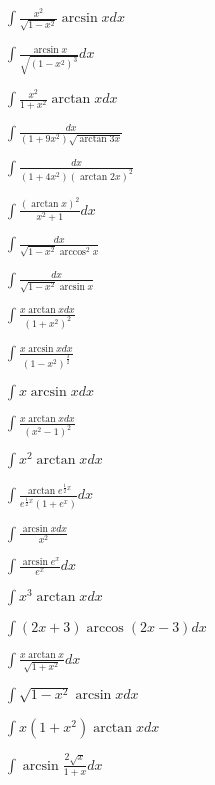 
\begin{multicols}{2}
$\displaystyle \int \frac{x^2}{\sqrt{1-x^2}}\arcsin x dx$

$\displaystyle \int \frac{\arcsin x}{\sqrt{(1-x^2)^3}} dx$

$\displaystyle \int \frac{x^2}{1+x^2}\arctan x dx$

$\displaystyle \int \frac{dx}{(1+9x^2)\sqrt{\arctan 3x}}$

$\displaystyle \int \frac{dx}{(1+4x^2)(\arctan 2x)^2}$

$\displaystyle \int \frac{(\arctan x)^2}{x^2+1}dx$

$\displaystyle \int \frac{dx}{\sqrt{1-x^2}\arccos^2 x}$

$\displaystyle \int \frac{dx}{\sqrt{1-x^2}\arcsin x}$

$\displaystyle \int \frac{x\arctan x dx}{(1+x^2)^2}$

$\displaystyle \int \frac{x\arcsin x dx}{(1-x^2)^{\frac{3}{2}}}$

$\displaystyle \int x\arcsin x dx$

$\displaystyle \int \frac{x\arctan x dx}{(x^2-1)^2}$

$\displaystyle \int x^2\arctan x dx$

$\displaystyle \int \frac{\arctan e^{\frac{1}{2}x}}{e^{\frac{1}{2}x}(1+e^x)}dx$

$\displaystyle \int \frac{\arcsin x dx}{x^2}$

$\displaystyle \int \frac{\arcsin e^x}{e^x}dx$

$\displaystyle \int x^3\arctan x dx$

$\displaystyle \int (2x+3)\arccos (2x-3) dx$

$\displaystyle \int \frac{x\arctan x}{\sqrt{1+x^2}}dx$

$\displaystyle \int \sqrt{1-x^2}\arcsin x dx$

$\displaystyle \int x(1+x^2)\arctan x dx$

$\displaystyle \int \arcsin \frac{2\sqrt{x}}{1+x}dx$
\end{multicols}


